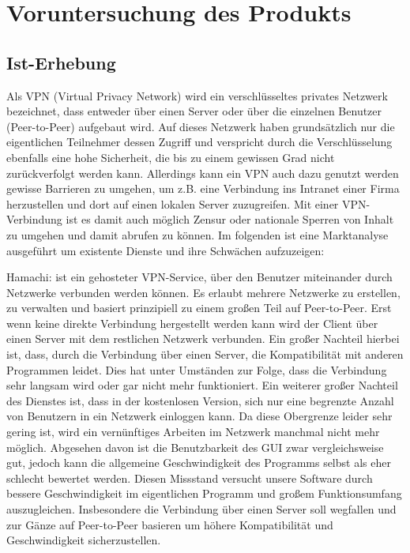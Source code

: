 \documentclass[a4paper,12pt]{scrreprt}
\begin{document}
\chapter{Voruntersuchung des Produkts}
	\section{Ist-Erhebung}
	
	Als VPN (Virtual Privacy Network) wird ein verschlüsseltes privates Netzwerk bezeichnet, dass entweder über einen Server oder über die einzelnen Benutzer (Peer-to-Peer) aufgebaut wird. Auf dieses Netzwerk haben grundsätzlich nur die eigentlichen Teilnehmer dessen Zugriff und verspricht durch die Verschlüsselung ebenfalls eine hohe Sicherheit, die bis zu einem gewissen Grad nicht zurückverfolgt werden kann. Allerdings kann ein VPN auch dazu genutzt werden gewisse Barrieren zu umgehen, um z.B. eine Verbindung ins Intranet einer Firma herzustellen und dort auf einen lokalen Server zuzugreifen. Mit einer VPN-Verbindung ist es damit auch möglich Zensur oder nationale Sperren von Inhalt zu umgehen und damit abrufen zu können. Im folgenden ist eine Marktanalyse ausgeführt um existente Dienste und ihre Schwächen aufzuzeigen:
	
	Hamachi: ist ein gehosteter VPN-Service, über den Benutzer miteinander durch Netzwerke verbunden werden können. Es erlaubt mehrere Netzwerke zu erstellen, zu verwalten und basiert prinzipiell zu einem großen Teil auf Peer-to-Peer. Erst wenn keine direkte Verbindung hergestellt werden kann wird der Client über einen Server mit dem restlichen Netzwerk verbunden. Ein großer Nachteil hierbei ist, dass, durch die Verbindung über einen Server, die Kompatibilität mit anderen Programmen leidet. Dies hat unter Umständen zur Folge, dass die Verbindung sehr langsam wird oder gar nicht mehr funktioniert. Ein weiterer großer Nachteil des Dienstes ist, dass in der kostenlosen Version, sich nur eine begrenzte Anzahl von Benutzern in ein Netzwerk einloggen kann. Da diese Obergrenze leider sehr gering ist, wird ein vernünftiges Arbeiten im Netzwerk manchmal nicht mehr möglich. Abgesehen davon ist die Benutzbarkeit des GUI zwar vergleichsweise gut, jedoch kann die allgemeine Geschwindigkeit des Programms selbst als eher schlecht bewertet werden. Diesen Missstand versucht unsere Software durch bessere Geschwindigkeit im eigentlichen Programm und großem Funktionsumfang auszugleichen. Insbesondere die Verbindung über einen Server soll wegfallen und zur Gänze auf Peer-to-Peer basieren um höhere Kompatibilität und Geschwindigkeit sicherzustellen.
	
\end{document}
